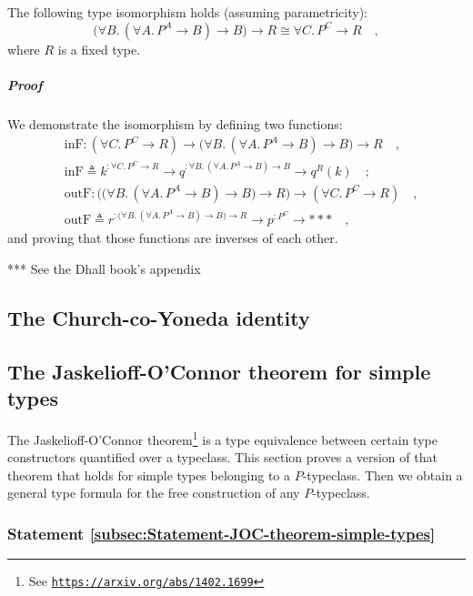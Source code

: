 The following type isomorphism holds (assuming parametricity):
\[
\big(\forall B.\,(\forall A.\,P^{A}\rightarrow B)\rightarrow B\big)\rightarrow R\cong\forall C.\,P^{C}\rightarrow R\quad,
\]
where $R$ is a fixed type.

\subparagraph{Proof}

We demonstrate the isomorphism by defining two functions:
\begin{align*}
 & \text{inF}:(\forall C.\,P^{C}\rightarrow R)\rightarrow\big(\forall B.\,(\forall A.\,P^{A}\rightarrow B)\rightarrow B\big)\rightarrow R\quad,\\
 & \text{inF}\triangleq k^{:\forall C.\,P^{C}\rightarrow R}\rightarrow q^{:\forall B.\,(\forall A.\,P^{A}\rightarrow B)\rightarrow B}\rightarrow q^{R}(k)\quad;\\
 & \text{outF}:\big(\big(\forall B.\,(\forall A.\,P^{A}\rightarrow B)\rightarrow B\big)\rightarrow R\big)\rightarrow(\forall C.\,P^{C}\rightarrow R)\quad,\\
 & \text{outF}\triangleq r^{:\big(\forall B.\,(\forall A.\,P^{A}\rightarrow B)\rightarrow B\big)\rightarrow R}\rightarrow p^{:P^{C}}\rightarrow***\quad,
\end{align*}
and proving that those functions are inverses of each other.

{*}{*}{*} See the Dhall book\textsf{'}s appendix

\subsection{The Church-co-Yoneda identity}

\subsection{The Jaskelioff-O\textsf{'}Connor theorem for simple types}

The Jaskelioff-O\textsf{'}Connor theorem\footnote{See \texttt{\href{https://arxiv.org/abs/1402.1699}{https://arxiv.org/abs/1402.1699}}}
is a type equivalence between certain type constructors quantified
over a typeclass. This section proves a version of that theorem that
holds for simple types belonging to a $P$-typeclass. Then we obtain
a general type formula for the free construction of any $P$-typeclass.

\subsubsection{Statement \label{subsec:Statement-JOC-theorem-simple-types}\ref{subsec:Statement-JOC-theorem-simple-types}}

